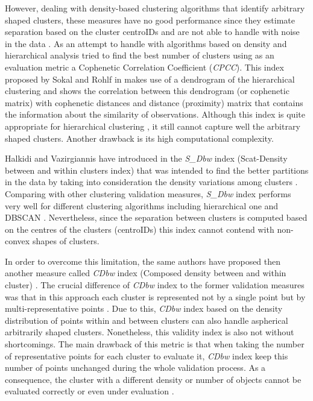 \documentclass[fontsize=12pt,a4paper,twoside,openany]{scrbook}
\begin{document}
However, dealing with density-based clustering algorithms that identify arbitrary shaped clusters, these measures have no good performance since they estimate separation based on the cluster centroIDs and are not able to handle with noise in the data \parencite{Moulavi14}. As an attempt to handle with algorithms based on density and hierarchical analysis \textcite{Saracli13} tried to find the best number of clusters using as an evaluation metric a Cophenetic Correlation Coefficient (\emph{CPCC}). This index proposed by Sokal and Rohlf in \cite*{Sokal62} makes use of a dendrogram of the hierarchical clustering and shows the correlation between this dendrogram (or cophenetic matrix) with cophenetic distances and distance (proximity) matrix that contains the information about the similarity of observations. Although this index is quite appropriate for hierarchical clustering \parencite{Palacio19}, it still cannot capture well the arbitrary shaped clusters. Another drawback is its high computational complexity.

Halkidi and Vazirgiannis have introduced in \cite*{Halkidi01b} the \emph{S\_Dbw} index (Scat-Density between and within clusters index) that was intended to find the better partitions in the data by taking into consideration the density variations among clusters \parencite{Halkidi01b}. Comparing with other clustering validation measures, \emph{S\_Dbw} index performs very well for different clustering algorithms including hierarchical one and DBSCAN \parencite{Liu10}. Nevertheless, since the separation between clusters is computed based on the centres of the clusters (centroIDs) this index cannot contend with non-convex shapes of clusters.

In order to overcome this limitation, the same authors have proposed then another measure called \emph{CDbw} index (Composed density between and within cluster) \parencite{Halkidi08}. The crucial difference of \emph{CDbw} index to the former validation measures was that in this approach each cluster is represented not by a single point but by multi-representative points \parencite{Halkidi08}. Due to this, \emph{CDbw} index based on the density distribution of points within and between clusters can also handle aspherical arbitrarily shaped clusters. Nonetheless, this validity index is also not without shortcomings. The main drawback of this metric is that when taking the number of representative points for each cluster to evaluate it, \emph{CDbw} index keep this number of points unchanged during the whole validation process. As a consequence, the cluster with a different density or number of objects cannot be evaluated correctly or even under evaluation \parencite{Moulavi14}.
\end{document}
